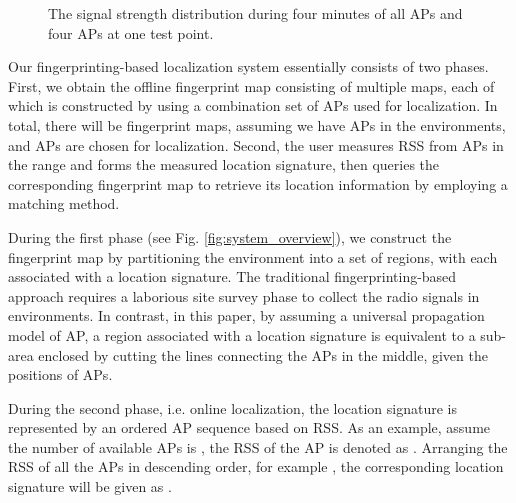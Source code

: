 \documentclass[10pt, conference, letterpaper]{IEEEtran}
\begin{document}
\begin{figure}
  \centering
   \caption[RSS of the APS]
{The signal strength distribution during four minutes of all APs and four APs at one test point.}
\label{fig:RSS}
\vspace{-0.2in}
\end{figure}

Our fingerprinting-based localization system essentially consists of two phases. 
First, 
we obtain the offline fingerprint map consisting of multiple maps, 
each of which is constructed by using a combination set of APs used for localization. 
In total, there will be  fingerprint maps, 
assuming we have  APs in the environments, and  APs are chosen for localization. 
Second, the user measures RSS from APs in the range and forms the measured location signature, 
then queries the corresponding fingerprint map to retrieve its location information by employing a matching method. 

During the first phase (see Fig. \ref{fig:system_overview}), 
we construct the fingerprint map by partitioning the environment into a set of regions, with each associated with a location signature. 
The traditional fingerprinting-based approach requires a laborious site survey phase to collect the radio signals in environments. 
In contrast, in this paper, by assuming a universal propagation model of AP, 
a region associated with a location signature is equivalent to a sub-area enclosed by cutting the lines connecting the APs in the middle, given the positions of APs.

During the second phase, i.e. online localization, the location signature is represented by an ordered AP sequence based on RSS. 
As an example, assume the number of available APs is , the RSS of the  AP is denoted as . 
Arranging the RSS of all the  APs in descending order, for example , the corresponding location signature will be given as .
\end{document}
